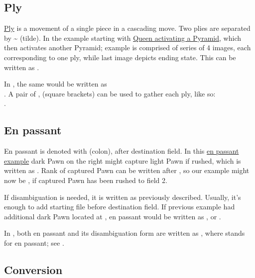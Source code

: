 \subsection*{Ply}
\label{sec:Appendix/Notation/Ply}

\hyperref[sec:Terms/Ply]{Ply} is a movement of a single piece in a cascading move. Two plies
are separated by \~{} (tilde). In the example starting with
\hyperref[fig:scn_ma_11_cascading_init]{Queen activating a Pyramid}, which then activates
another Pyramid; example is comprised of series of 4 images, each corresponding to one ply,
while last image depicts ending state. This can be written as .

In , the same would be written as \\
. A pair of \alg{[}, \alg{]} (square brackets) can be used
to gather each ply, like so: \\
\alg{[Qk2-f7]\~{}[Af7-i7]\~{}[Ai7-i9]}.

\subsection*{En passant}
\label{sec:Appendix/Notation/En passant}

En passant is denoted with \alg{:} (colon), after destination field. In this
\hyperref[fig:04_croatian_ties_en_passant]{en passant example} dark Pawn on the right might
capture light Pawn if rushed, which is written as . Rank of captured Pawn can be
written after \alg{:}, so our example might now be , if captured Pawn has been
rushed to field 2.

If disambiguation is needed, it is written as previously described. Usually, it's enough to
add starting file before destination field. If previous example had additional dark Pawn
located at , en passant would be written as , or .

In , both en passant and its disambiguation form are written as
, where  stands for en passant; see .

\subsection*{Conversion}
\label{sec:Appendix/Notation/Conversion}

